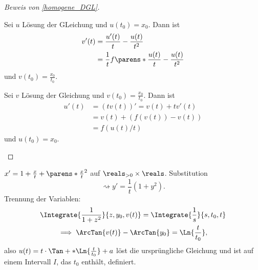 \begin{proof}[Beweis von \ref{homogene_DGL}]
  \begin{proofdescription}
    \item[\hin] Sei \( u \) Lösung der  GLeichung und \( u(t_0)=x_0 \). Dann ist 
    \begin{align*}
      v'(t)&=\frac{u'(t)}{t}-\frac{u(t)}{t^2}\\
      &=\frac{1}{t}f\parens*{\frac{u(t)}{t}}-\frac{u(t)}{t^2}
    \end{align*}
    und \( v(t_0)=\frac{x_0}{t_0} \).
    \item[\rueck] Sei \( v \) Lösung der  Gleichung und \( v(t_0)=\frac{x_0}{t_0} \). Dann ist
    \begin{align*}
      u'(t)&=(t v(t))'=v(t)+t v'(t)\\
      &=v(t)+(f(v(t))-v(t))\\
      &=f(u(t)/t)
    \end{align*}
    und \( u(t_0)=x_0 \).
  \end{proofdescription}
  
\end{proof}
\begin{beispiel*}
  \( x'=1+\frac{x}{t}+\parens*{\frac{x}{t}}^2 \) auf \( \reals_{>0}\times \reals \). Substitution
  \begin{equation*}
    \rightsquigarrow y'=\frac{1}{t}(1+y^2).
  \end{equation*}
  Trennung der Variablen:
  \begin{gather*}
    \Integrate{\frac{1}{1+z^2}}{z,y_0,v(t)}=\Integrate{\frac{1}{s}}{s,t_0,t}\\
    \implies\ArcTan{v(t)}-\ArcTan{y_0}=\Ln{\frac{t}{t_0}},
  \end{gather*}
  also \( u(t)=t\cdot \Tan+*{\Ln{\frac{t}{t_0}}+a} \) löst die ursprüngliche Gleichung und ist auf einem Intervall \( I \), das \( t_0 \) enthält, definiert.
\end{beispiel*}
